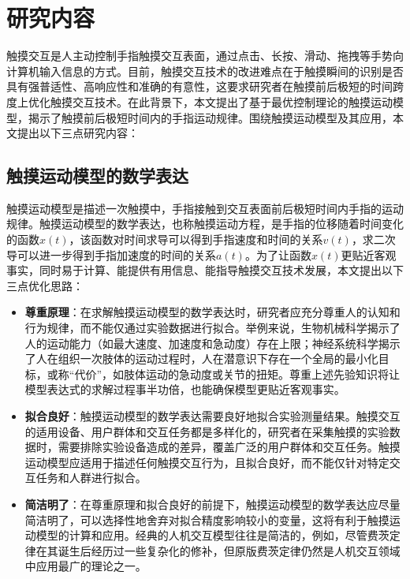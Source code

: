 \section{研究内容}

触摸交互是人主动控制手指触摸交互表面，通过点击、长按、滑动、拖拽等手势向计算机输入信息的方式。目前，触摸交互技术的改进难点在于触摸瞬间的识别是否具有强普适性\cite{gu2019accurate, harrison2011omnitouch, xiao2018mrtouch}、高响应性\cite{xia2014zero, leigh2014high, ng2012designing}和准确的有意性\cite{gu2021typeboard, xu2020recognizing, le2018palmtouch}，这要求研究者在触摸前后极短的时间跨度上优化触摸交互技术。在此背景下，本文提出了基于最优控制理论的触摸运动模型，揭示了触摸前后极短时间内的手指运动规律。围绕触摸运动模型及其应用，本文提出以下三点研究内容：

\subsection{触摸运动模型的数学表达}

触摸运动模型是描述一次触摸中，手指接触到交互表面前后极短时间内手指的运动规律。触摸运动模型的数学表达，也称触摸运动方程，是手指的位移随着时间变化的函数$x(t)$，该函数对时间求导可以得到手指速度和时间的关系$v(t)$，求二次导可以进一步得到手指加速度的时间的关系$a(t)$。为了让函数$x(t)$更贴近客观事实，同时易于计算、能提供有用信息、能指导触摸交互技术发展，本文提出以下三点优化思路：

\begin{itemize}
\item{\textbf{尊重原理}：在求解触摸运动模型的数学表达时，研究者应充分尊重人的认知和行为规律，而不能仅通过实验数据进行拟合。举例来说，生物机械科学揭示了人的运动能力（如最大速度、加速度和急动度）存在上限\cite{nelson1983physical}；神经系统科学揭示了人在组织一次肢体的运动过程时，人在潜意识下存在一个全局的最小化目标，或称“代价”，如肢体运动的急动度\cite{flash1985coordination}或关节的扭矩\cite{uno1989formation}。尊重上述先验知识将让模型表达式的求解过程事半功倍，也能确保模型更贴近客观事实。}
\item{\textbf{拟合良好}：触摸运动模型的数学表达需要良好地拟合实验测量结果。触摸交互的适用设备、用户群体和交互任务都是多样化的，研究者在采集触摸的实验数据时，需要排除实验设备造成的差异，覆盖广泛的用户群体和交互任务。触摸运动模型应适用于描述任何触摸交互行为，且拟合良好，而不能仅针对特定交互任务和人群进行拟合。}
\item{\textbf{简洁明了}：在尊重原理和拟合良好的前提下，触摸运动模型的数学表达应尽量简洁明了，可以选择性地舍弃对拟合精度影响较小的变量，这将有利于触摸运动模型的计算和应用。经典的人机交互模型往往是简洁的，例如，尽管费茨定律在其诞生后经历过一些复杂化的修补\cite{mackenzie1995movement, wobbrock2008error, welford1968fundamentals, kopper2010human}，但原版费茨定律仍然是人机交互领域中应用最广的理论之一\cite{fitts1954information}。}
\end{itemize}

